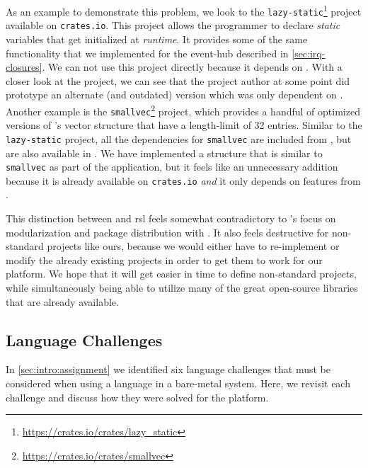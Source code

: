 As an example to demonstrate this problem, we look to the \texttt{lazy-static}\footnote{\url{https://crates.io/crates/lazy_static}} project available on \texttt{crates.io}.
This project allows the programmer to declare \emph{static} variables that get initialized at \emph{runtime}.
It provides some of the same functionality that we implemented for the event-hub described in \autoref{sec:irq-closures}.
We can not use this project directly because it depends on {\std}.
With a closer look at the project, we can see that the project author at some point did prototype an alternate (and outdated) version which was only dependent on {\core}.
Another example is the \texttt{smallvec}\footnote{\url{https://crates.io/crates/smallvec}} project, which provides a handful of optimized versions of {\rust}'s vector structure that have a length-limit of 32 entries.
Similar to the \texttt{lazy-static} project, all the dependencies for \texttt{smallvec} are included from {\std}, but are also available in {\core}.
We have implemented a structure that is similar to \texttt{smallvec} as part of the {\tracker} application, but it feels like an unnecessary addition because it is already available on \texttt{crates.io} \emph{and} it only depends on features from {\core}.

This distinction between {\std} and \gls{rsl} feels somewhat contradictory to {\rust}'s focus on modularization and package distribution with {\cargo}.
It also feels destructive for non-standard projects like ours, because we would either have to re-implement or modify the already existing projects in order to get them to work for our platform.
We hope that it will get easier in time to define non-standard projects, while simultaneously being able to utilize many of the great open-source libraries that are already available.

\subsection{Language Challenges}
\label{sec:disc:lang-challenges}

In \autoref{sec:intro:assignment} we identified six language challenges that must be considered when using a language in a bare-metal system.
Here, we revisit each challenge and discuss how they were solved for the {\rg} platform.

